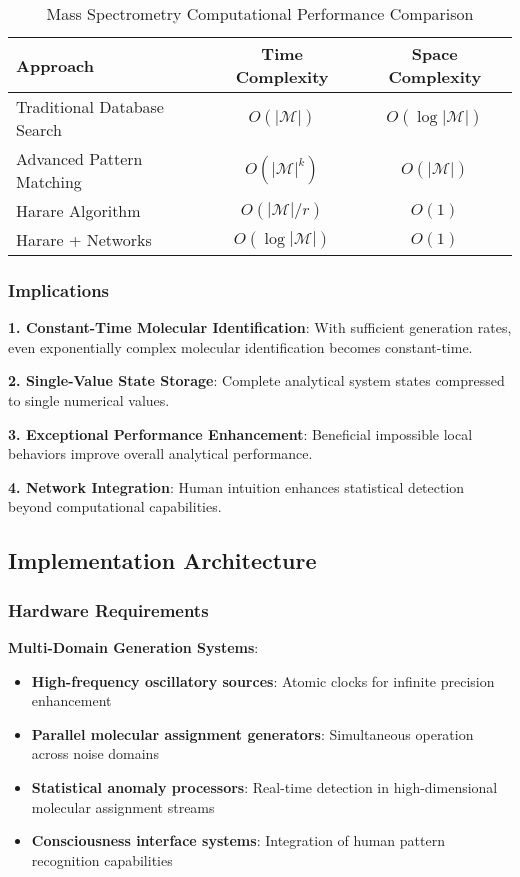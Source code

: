 \documentclass[11pt,a4paper]{article}
\theoremstyle{remark}
\begin{document}
\begin{table}[H]
\centering
\caption{Mass Spectrometry Computational Performance Comparison}
\begin{tabular}{lcc}
\toprule
Approach & Time Complexity & Space Complexity \\
\midrule
Traditional Database Search & $O(|\mathcal{M}|)$ & $O(\log|\mathcal{M}|)$ \\
Advanced Pattern Matching & $O(|\mathcal{M}|^k)$ & $O(|\mathcal{M}|)$ \\
Harare Algorithm & $O(|\mathcal{M}|/r)$ & $O(1)$ \\
Harare + Networks & $O(\log|\mathcal{M}|)$ & $O(1)$ \\
\bottomrule
\end{tabular}
\end{table}

\subsubsection{Implications}

\textbf{1. Constant-Time Molecular Identification}: With sufficient generation rates, even exponentially complex molecular identification becomes constant-time.

\textbf{2. Single-Value State Storage}: Complete analytical system states compressed to single numerical values.

\textbf{3. Exceptional Performance Enhancement}: Beneficial impossible local behaviors improve overall analytical performance.

\textbf{4. Network Integration}: Human intuition enhances statistical detection beyond computational capabilities.

\subsection{Implementation Architecture}

\subsubsection{Hardware Requirements}

\textbf{Multi-Domain Generation Systems}:
\begin{itemize}
\item \textbf{High-frequency oscillatory sources}: Atomic clocks for infinite precision enhancement
\item \textbf{Parallel molecular assignment generators}: Simultaneous operation across noise domains
\item \textbf{Statistical anomaly processors}: Real-time detection in high-dimensional molecular assignment streams
\item \textbf{Consciousness interface systems}: Integration of human pattern recognition capabilities
\end{itemize}
\end{document}
